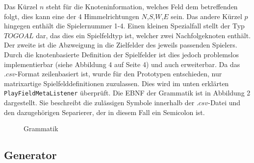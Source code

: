 \documentclass[conference]{IEEEtran}
\begin{document}
Das K\"urzel $n$ steht f\"ur die Knoteninformation, welches Feld dem betreffenden folgt, dies kann eine der 4 Himmelrichtungen $N$,$S$,$W$,$E$ sein. Das andere K\"urzel $p$ hingegen enth\"alt die Spielernummer 1-4. Einen kleinen Spezialfall stellt der Typ $TOGOAL$ dar, das dies ein Spielfeldtyp ist, welcher zwei Nachfolgeknoten enth\"alt. Der zweite ist die Abzweigung in die Zielfelder des jeweils passenden Spielers. Durch die knotenbasierte Definition
der Spielfelder ist dies jedoch problemslos implementierbar (siehe Abbildung 4 auf Seite 4) und auch erweiterbar.
Da das $.csv$-Format zeilenbasiert ist, wurde f\"ur den Prototypen entschieden, nur matrixartige Spielfelddefinitionen zuzulassen. Dies wird im unten erkl\"arten \texttt{PlayFieldMetaListener} \"uberpr\"uft.
Die EBNF der Grammatik ist in Abbildung 2 dargestellt. Sie beschreibt die zul\"assigen Symbole innerhalb der $.csv$-Datei und den dazugeh\"origen Separierer, der in diesem Fall ein Semicolon ist. 

\begin{figure}[]
    \centering
    \caption{Grammatik}
\end{figure}


\subsection{Generator}
\end{document}

